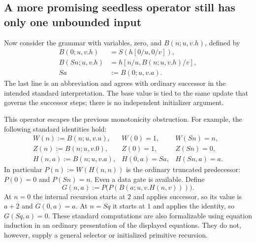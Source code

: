 \subsection{A more promising seedless operator still has only one unbounded input}

Now consider the grammar with variables, zero, and
$B(n;u,v.h)$, defined by
\[
 \begin{aligned}
 B(0;u,v.h)&=S(h[0/u,0/v]),\\
 B(Sn;u,v.h)&=h[n/u,B(n;u,v.h)/v],\\
 Sa&:=B(0;u,v.a).
 \end{aligned}
 \tag{Successor at the base}\label{seedless:B}
\]
The last line is an abbreviation and agrees with ordinary successor in
the intended standard interpretation. The base value is tied to the
same update that governs the successor steps; there is no independent
initializer argument.

This operator escapes the previous monotonicity obstruction.
For example, the following standard identities hold:
\[
 \begin{array}{lll}
 W(n):=B(n;u,v.u),&W(0)=1,&W(Sn)=n,\\
 Z(n):=B(n;u,v.0),&Z(0)=1,&Z(Sn)=0,\\
 H(n,a):=B(n;u,v.a),&H(0,a)=Sa,&H(Sn,a)=a.
 \end{array}
\]
In particular $P(n):=W(H(n,n))$ is the ordinary truncated predecessor:
$P(0)=0$ and $P(Sn)=n$. Even a data gate is available. Define
\[
        G(n,a):=P\bigl(P(B(a;u,v.H(n,v)))\bigr).
\]
At $n=0$ the internal recursion starts at $2$ and applies successor,
so its value is $a+2$ and $G(0,a)=a$. At $n=Sq$ it starts at $1$
and applies the identity, so $G(Sq,a)=0$. These standard computations
are also formalizable using equation induction in an ordinary
presentation of the displayed equations. They do not, however, supply
a general selector or initialized primitive recursion.

